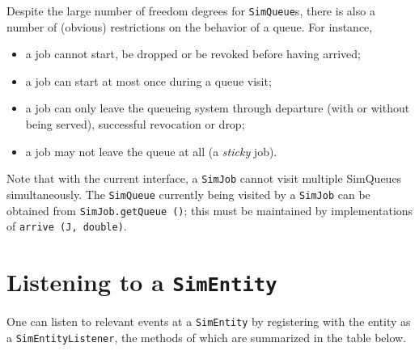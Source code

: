 \documentclass[12pt]{book}
\begin{document}
Despite the large number of freedom degrees for \lstinline-SimQueue-s,
  there is also a number of (obvious) restrictions on the behavior of a queue.
For instance,
\begin{itemize}
  \item a job cannot start, be dropped or be revoked before having arrived;
  \item a job can start at most once during a queue visit;
  \item a job can only leave the queueing system through departure (with or without being served),
        successful revocation or drop; 
  \item a job may not leave the queue at all (a {\em sticky\/} job).
\end{itemize}
Note that with the current interface, a \lstinline|SimJob| cannot visit multiple SimQueues simultaneously.
The \lstinline|SimQueue| currently being visited by a \lstinline|SimJob|
  can be obtained from \lstinline|SimJob.getQueue ()|;
  this must be maintained by implementations of \lstinline|arrive (J, double)|.

\section{Listening to a \lstinline|SimEntity|}

One can listen to relevant events at a \lstinline|SimEntity| by registering with the entity
  as a \lstinline|SimEntityListener|, the methods of which are summarized in the table below.
\end{document}
